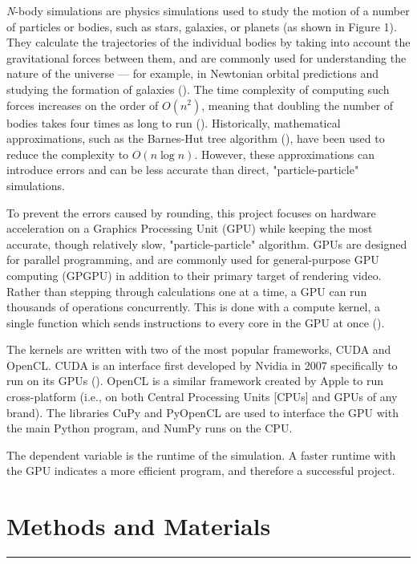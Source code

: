 \documentclass[12pt, letterpaper]{article}
\begin{document}
\textit{N}-body simulations are physics simulations used to study the 
motion of a number of particles or bodies, such as stars, galaxies, or 
planets (as shown in Figure 1). They calculate the trajectories of the 
individual bodies by taking into account the gravitational forces between 
them, and are commonly used for understanding the nature of the universe — 
for example, in Newtonian orbital predictions and studying the formation 
of galaxies (\cite{antonana_majorant_2022}). The time complexity of 
computing such forces increases on the order of 
\begin{math}O(n^2)\end{math}, meaning that doubling the number of bodies 
takes four times as long to run (\cite{trenti_n-body_2008}). Historically, 
mathematical approximations, such as the Barnes-Hut tree algorithm 
(\cite{anderson_tree_1999}), have been used to reduce the complexity to 
\begin{math}O(n\log n)\end{math}. However, these approximations can 
introduce errors and can be less accurate than direct, "particle-particle" 
simulations. 

To prevent the errors caused by rounding, this project focuses on hardware 
acceleration on a Graphics Processing Unit (GPU) while keeping the most 
accurate, though relatively slow, "particle-particle" algorithm.  GPUs are 
designed for parallel programming, and are commonly used for 
general-purpose GPU computing (GPGPU) in addition to their primary target 
of rendering video. Rather than stepping through calculations one at a 
time, a GPU can run thousands of operations concurrently. This is done 
with a compute kernel, a single function which sends instructions to every 
core in the GPU at once (\cite{rasch_docal:_2020}).

The kernels are written with two of the most popular frameworks, CUDA and 
OpenCL. CUDA is an interface first developed by Nvidia in 2007 
specifically to run on its GPUs (\cite{rasch_docal:_2020}). OpenCL is a 
similar framework created by Apple to run cross-platform (i.e., on both 
Central Processing Units [CPUs] and GPUs of any brand). The libraries CuPy 
and PyOpenCL are used to interface the GPU with the main Python program, 
and NumPy runs on the CPU.

The dependent variable is the runtime of the simulation. A faster runtime 
with the GPU indicates a more efficient program, and therefore a 
successful project.

\section{Methods and Materials}
\vspace{1pt}\hrule\vspace{12pt}
\end{document}
